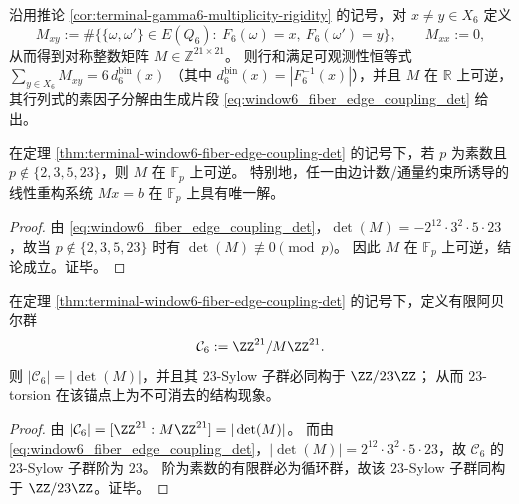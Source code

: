 \begin{theorem}\label{thm:terminal-window6-fiber-edge-coupling-det}
沿用推论 \ref{cor:terminal-gamma6-multiplicity-rigidity} 的记号，对 \(x\neq y\in X_6\) 定义
\[
M_{xy}:=\#\bigl\{\{\omega,\omega'\}\in E(Q_6):\ F_6(\omega)=x,\ F_6(\omega')=y\bigr\},
\qquad
M_{xx}:=0,
\]
从而得到对称整数矩阵 \(M\in\mathbb{Z}^{21\times 21}\)。
则行和满足可观测性恒等式
\(
\sum_{y\in X_6}M_{xy}=6\,d^{\mathrm{bin}}_6(x)
\)
（其中 \(d^{\mathrm{bin}}_6(x)=|F_6^{-1}(x)|\)），并且 \(M\) 在 \(\mathbb{R}\) 上可逆，其行列式的素因子分解由生成片段 \eqref{eq:window6_fiber_edge_coupling_det} 给出。
\end{theorem}


\begin{corollary}\label{cor:terminal-window6-fiber-edge-coupling-p-adic-window}
在定理 \ref{thm:terminal-window6-fiber-edge-coupling-det} 的记号下，若 \(p\) 为素数且 \(p\notin\{2,3,5,23\}\)，则 \(M\) 在 \(\mathbb{F}_p\) 上可逆。
特别地，任一由边计数/通量约束所诱导的线性重构系统 \(Mx=b\) 在 \(\mathbb{F}_p\) 上具有唯一解。
\end{corollary}
\begin{proof}
由 \eqref{eq:window6_fiber_edge_coupling_det}，\(\det(M)=-2^{12}\cdot 3^{2}\cdot 5\cdot 23\)，故当 \(p\notin\{2,3,5,23\}\) 时有 \(\det(M)\not\equiv 0\pmod p\)。
因此 \(M\) 在 \(\mathbb{F}_p\) 上可逆，结论成立。证毕。
\end{proof}



\begin{corollary}\label{cor:terminal-window6-coupling-response-group-23-torsion}
在定理 \ref{thm:terminal-window6-fiber-edge-coupling-det} 的记号下，定义有限阿贝尔群
\[
\mathcal{C}_6:=\ZZ^{21}/M\ZZ^{21}.
\]
则 \(|\mathcal{C}_6|=|\det(M)|\)，并且其 \(23\)-Sylow 子群必同构于 \(\ZZ/23\ZZ\)；
从而 \(23\)-torsion 在该锚点上为不可消去的结构现象。
\end{corollary}
\begin{proof}
由 \(|\mathcal{C}_6|=[\ZZ^{21}:M\ZZ^{21}]=|\det(M)|\)。
而由 \eqref{eq:window6_fiber_edge_coupling_det}，\(|\det(M)|=2^{12}\cdot 3^{2}\cdot 5\cdot 23\)，故 \(\mathcal{C}_6\) 的 \(23\)-Sylow 子群阶为 \(23\)。
阶为素数的有限群必为循环群，故该 \(23\)-Sylow 子群同构于 \(\ZZ/23\ZZ\)。证毕。
\end{proof}




